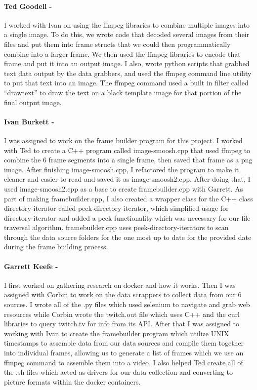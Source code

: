 \documentclass{article}
\begin{document}
    \paragraph{Ted Goodell -}
    I worked with Ivan on using the ffmpeg libraries to combine multiple images into a single image. To do this, we wrote code that decoded several images from their files and put them into frame structs that we could then programmatically combine into a larger frame. We then used the ffmpeg libraries to encode that frame and put it into an output image. I also, wrote python scripts that grabbed text data output by the data grabbers, and used the ffmpeg command line utility to put that text into an image. The ffmpeg command used a built in filter called “drawtext” to draw the text on a black template image for that portion of the final output image.
    \paragraph{Ivan Burkett -}
    I was assigned to work on the frame builder program for this project. I worked with Ted to create a C++ program called image-smoosh.cpp that used ffmpeg to combine the 6 frame segments into a single frame, then saved that frame as a png image. After finishing image-smoosh.cpp, I refactored the program to make it cleaner and easier to read and saved it as image-smoosh2.cpp. After doing that, I used image-smoosh2.cpp as a base to create framebuilder.cpp with Garrett. As part of making framebuilder.cpp, I also created a wrapper class for the C++ class directory-iterator called peek-directory-iterator, which simplified usage for directory-iterator and added a peek functionality which was necessary for our file traversal algorithm. framebuilder.cpp uses peek-directory-iterators to scan through the data source folders for the one most up to date for the provided date during the frame building process.
    \paragraph{Garrett Keefe -}
    I first worked on gathering research on docker and how it works. Then I was assigned with Corbin to work on the data scrappers to collect data from our 6 sources. I wrote all of the .py files which used selenium to navigate and grab web resources while Corbin wrote the twitch.out file which uses C++ and the curl libraries to query twitch.tv for info from its API. After that I was assigned to working with Ivan to create the framebuilder program which utilize UNIX timestamps to assemble data from our data sources and compile them together into individual frames, allowing us to generate a list of frames which we use an ffmpeg command to assemble them into a video. I also helped Ted create all of the .sh files which acted as drivers for our data collection and converting to picture formats within the docker containers.
\end{document}
